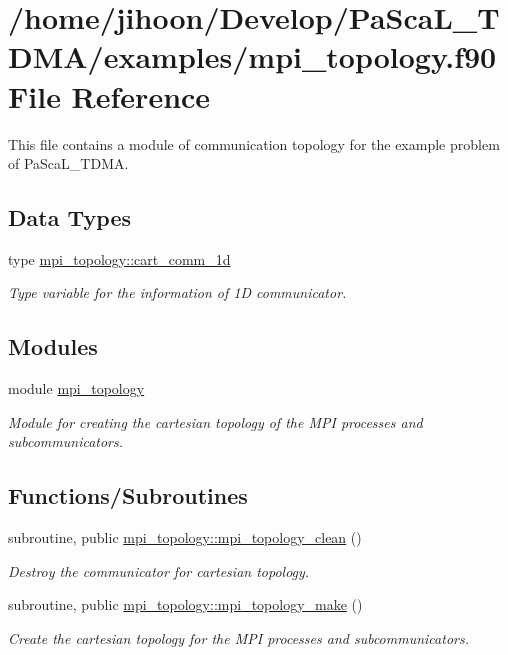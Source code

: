 \hypertarget{mpi__topology_8f90}{}\section{/home/jihoon/\+Develop/\+Pa\+Sca\+L\+\_\+\+T\+D\+M\+A/examples/mpi\+\_\+topology.f90 File Reference}
\label{mpi__topology_8f90}


This file contains a module of communication topology for the example problem of Pa\+Sca\+L\+\_\+\+T\+D\+MA.  


\subsection*{Data Types}
\begin{DoxyCompactItemize}
\item 
type \hyperlink{structmpi__topology_1_1cart__comm__1d}{mpi\+\_\+topology\+::cart\+\_\+comm\+\_\+1d}
\begin{DoxyCompactList}\small\item\em Type variable for the information of 1D communicator. \end{DoxyCompactList}\end{DoxyCompactItemize}
\subsection*{Modules}
\begin{DoxyCompactItemize}
\item 
module \hyperlink{namespacempi__topology}{mpi\+\_\+topology}
\begin{DoxyCompactList}\small\item\em Module for creating the cartesian topology of the M\+PI processes and subcommunicators. \end{DoxyCompactList}\end{DoxyCompactItemize}
\subsection*{Functions/\+Subroutines}
\begin{DoxyCompactItemize}
\item 
subroutine, public \hyperlink{namespacempi__topology_aa14e91baaec6d1c1082ebd5ac6e19128}{mpi\+\_\+topology\+::mpi\+\_\+topology\+\_\+clean} ()
\begin{DoxyCompactList}\small\item\em Destroy the communicator for cartesian topology. \end{DoxyCompactList}\item 
subroutine, public \hyperlink{namespacempi__topology_a8819f16f50aded913f17520a29d3ec4c}{mpi\+\_\+topology\+::mpi\+\_\+topology\+\_\+make} ()
\begin{DoxyCompactList}\small\item\em Create the cartesian topology for the M\+PI processes and subcommunicators. \end{DoxyCompactList}\end{DoxyCompactItemize}
